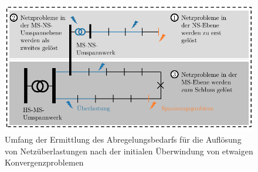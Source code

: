 \begin{figure}[H]
    \centering
    \includegraphics[width=\textwidth]{Bilder/grid_issues_scope_cropped}
    \caption[Umfang der Ermittlung des Abregelungsbedarfs für die Auflösung von Spannungsbandverletzungen und Betriebsmittelüberbelastungen nach der initialen Überwindung von etwaigen Konvergenzproblemen]{Umfang der Ermittlung des Abregelungsbedarfs für die Auflösung von Netzüberlastungen nach der initialen Überwindung von etwaigen Konvergenzproblemen \cite{Schachler}}\label{fig:scope_curtailment}
\end{figure}